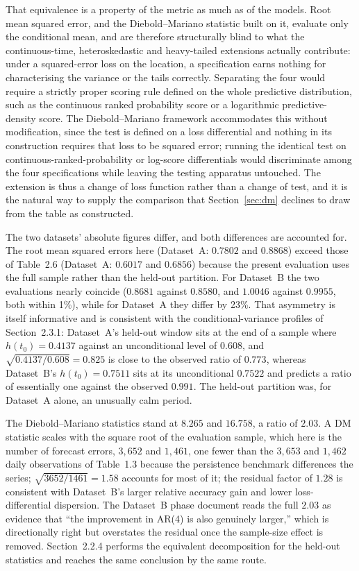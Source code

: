 \documentclass[11pt, a4paper, twoside]{article}
\begin{document}
That equivalence is a property of the metric as much as of the models. Root mean squared error, and the Diebold--Mariano statistic built on it, evaluate only the conditional mean, and are therefore structurally blind to what the continuous-time, heteroskedastic and heavy-tailed extensions actually contribute: under a squared-error loss on the location, a specification earns nothing for characterising the variance or the tails correctly. Separating the four would require a strictly proper scoring rule defined on the whole predictive distribution, such as the continuous ranked probability score or a logarithmic predictive-density score. The Diebold--Mariano framework accommodates this without modification, since the test is defined on a loss differential and nothing in its construction requires that loss to be squared error; running the identical test on continuous-ranked-probability or log-score differentials would discriminate among the four specifications while leaving the testing apparatus untouched. The extension is thus a change of loss function rather than a change of test, and it is the natural way to supply the comparison that Section~\ref{sec:dm} declines to draw from the table as constructed.

The two datasets' absolute figures differ, and both differences are accounted for. The root mean squared errors here (Dataset~A: $0.7802$ and $0.8868$) exceed those of Table~2.6 (Dataset~A: $0.6017$ and $0.6856$) because the present evaluation uses the full sample rather than the held-out partition. For Dataset~B the two evaluations nearly coincide ($0.8681$ against $0.8580$, and $1.0046$ against $0.9955$, both within 1\%), while for Dataset~A they differ by 23\%. That asymmetry is itself informative and is consistent with the conditional-variance profiles of Section~2.3.1: Dataset~A's held-out window sits at the end of a sample where $h(t_0) = 0.4137$ against an unconditional level of $0.608$, and $\sqrt{0.4137/0.608} = 0.825$ is close to the observed ratio of $0.773$, whereas Dataset~B's $h(t_0) = 0.7511$ sits at its unconditional $0.7522$ and predicts a ratio of essentially one against the observed $0.991$. The held-out partition was, for Dataset~A alone, an unusually calm period.

The Diebold--Mariano statistics stand at $8.265$ and $16.758$, a ratio of $2.03$. A DM statistic scales with the square root of the evaluation sample, which here is the number of forecast errors, $3{,}652$ and $1{,}461$, one fewer than the $3{,}653$ and $1{,}462$ daily observations of Table~1.3 because the persistence benchmark differences the series; $\sqrt{3652/1461} = 1.58$ accounts for most of it; the residual factor of $1.28$ is consistent with Dataset~B's larger relative accuracy gain and lower loss-differential dispersion. The Dataset~B phase document reads the full $2.03$ as evidence that ``the improvement in AR(4) is also genuinely larger,'' which is directionally right but overstates the residual once the sample-size effect is removed. Section~2.2.4 performs the equivalent decomposition for the held-out statistics and reaches the same conclusion by the same route.
\end{document}
